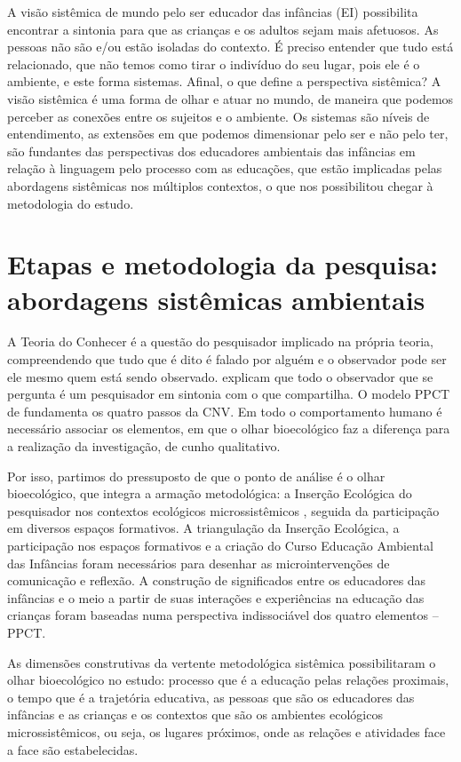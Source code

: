 \documentclass{textolivre-html}
\begin{document}
A visão sistêmica de mundo pelo ser educador das infâncias (EI) possibilita encontrar a sintonia para que as crianças e os adultos sejam mais afetuosos. As pessoas não são e/ou estão isoladas do contexto. É preciso entender que tudo está relacionado, que não temos como tirar o indivíduo do seu lugar, pois ele é o ambiente, e este forma sistemas. Afinal, o que define a perspectiva sistêmica? A visão sistêmica é uma forma de olhar e atuar no mundo, de maneira que podemos perceber as conexões entre os sujeitos e o ambiente. Os sistemas são níveis de entendimento, as extensões em que podemos dimensionar pelo ser e não pelo ter, são fundantes das perspectivas dos educadores ambientais das infâncias em relação à linguagem pelo processo com as educações, que estão implicadas pelas abordagens sistêmicas nos múltiplos contextos, o que nos possibilitou chegar à metodologia do estudo.



\section{Etapas e metodologia da pesquisa: abordagens sistêmicas ambientais}\label{sec-etapas}
A Teoria do Conhecer é a questão do pesquisador implicado na própria teoria, compreendendo que tudo que é dito é falado por alguém e o observador pode ser ele mesmo quem está sendo observado. \textcite{maturana2011} explicam que todo o observador que se pergunta é um pesquisador em sintonia com o que compartilha. O modelo PPCT de \textcite{brofen2011} fundamenta os quatro passos da CNV. Em todo o comportamento humano é necessário associar os elementos, em que o olhar bioecológico faz a diferença para a realização da investigação, de cunho qualitativo. 

Por isso, partimos do pressuposto de que o ponto de análise é o olhar bioecológico, que integra a armação metodológica: a Inserção Ecológica do pesquisador nos contextos ecológicos microssistêmicos \cite{piske2018c,koller2016,silveira2009}, seguida da participação em diversos espaços formativos. A triangulação da Inserção Ecológica, a participação nos espaços formativos e a criação do Curso Educação Ambiental das Infâncias foram necessários para desenhar as microintervenções de comunicação e reflexão. A construção de significados entre os educadores das infâncias e o meio a partir de suas interações e experiências na educação das crianças foram baseadas numa perspectiva indissociável dos quatro elementos – PPCT. 

As dimensões construtivas da vertente metodológica sistêmica possibilitaram o olhar bioecológico no estudo: processo que é a educação pelas relações proximais, o tempo que é a trajetória educativa, as pessoas que são os educadores das infâncias e as crianças e os contextos que são os ambientes ecológicos microssistêmicos, ou seja, os lugares próximos, onde as relações e atividades face a face são estabelecidas.  
\end{document}

